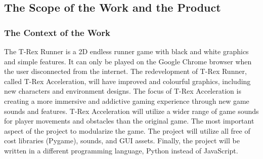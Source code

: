 \documentclass[12pt, titlepage]{article}
\begin{document}
\subsection{The Scope of the Work and the Product}

\subsubsection{The Context of the Work}

The T-Rex Runner is a 2D endless runner game with black and white graphics and simple features. It can only be played on the Google Chrome browser when the user disconnected from the internet. The redevelopment of T-Rex Runner, called T-Rex Acceleration, will have improved and colourful graphics, including new characters and environment designs. The focus of T-Rex Acceleration is creating a more immersive and addictive gaming experience through new game sounds and features. T-Rex Acceleration will utilize a wider range of game sounds for player movements and obstacles than the original game. The most important aspect of the project to modularize the game. The project will utilize all free of cost libraries (Pygame), sounds, and GUI assets. Finally, the project will be written in a different programming language, Python instead of JavaScript.
\end{document}
